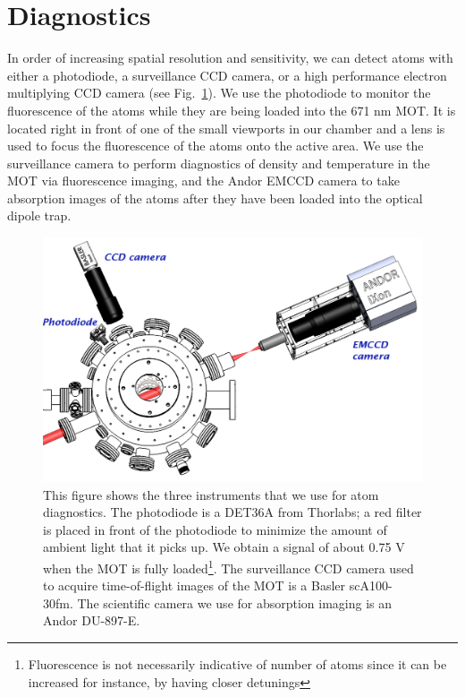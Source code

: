 \documentclass[oneside,12pt]{memoir}
\begin{document}
\section{Diagnostics}

In order of increasing spatial resolution and sensitivity, we can detect atoms
with either a photodiode, a surveillance CCD camera, or a high performance
electron multiplying CCD camera (see Fig.~\ref{fig:diagnostics}).   We use the
photodiode to monitor the fluorescence of the atoms while they are being loaded
into the 671 nm MOT.  It is located right in front of one of the small
viewports in our chamber and a lens is used to focus the fluorescence of the
atoms onto the active area.  We use the surveillance camera to perform
diagnostics of density and temperature in the MOT via fluorescence imaging, and
the Andor EMCCD camera to take absorption images of  the atoms after they have
been loaded into  the optical dipole trap.  \begin{figure}
\includegraphics[width=\textwidth]{../figures/imaging/setup.pdf}
\caption[Diagnostics setup]{\small This figure shows the three instruments that
we use for atom diagnostics.  The photodiode is a DET36A from Thorlabs; a red
filter is placed in front of the photodiode to minimize the amount of ambient
light that it picks up.  We obtain a signal of about 0.75 V when the MOT is
fully loaded\footnote{Fluorescence is not necessarily indicative of number of
atoms since it can be increased for instance, by having closer detunings}.  The
surveillance CCD camera used to acquire time-of-flight images of the MOT is a
Basler scA100-30fm.  The scientific camera we use for absorption imaging is an
Andor DU-897-E.  } \label{fig:diagnostics} \end{figure} 
\end{document}
